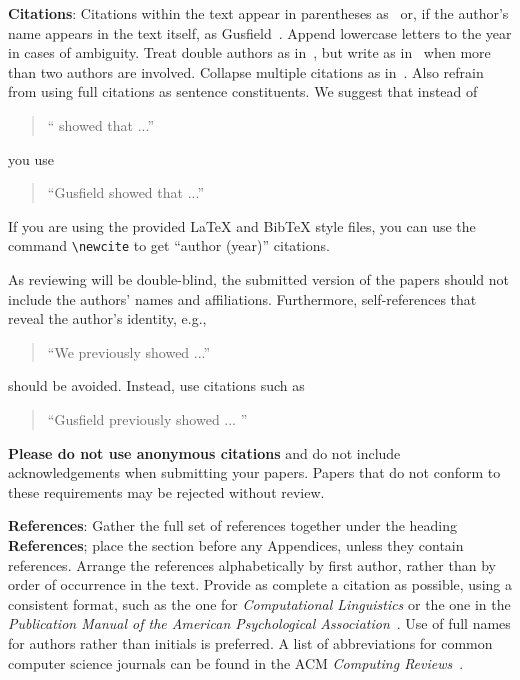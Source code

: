 \documentclass[11pt]{article}
\begin{document}
{\bf Citations}: Citations within the text appear
in parentheses as~\cite{Gusfield:97} or, if the author's name appears in
the text itself, as Gusfield~. 
Append lowercase letters to the year in cases of ambiguity.  
Treat double authors as in~\cite{Aho:72}, but write as in~\cite{Chandra:81} when more than two authors are involved. Collapse multiple citations as in~\cite{Gusfield:97,Aho:72}. Also refrain from using full citations as sentence constituents. We suggest that instead of
\begin{quote}
  ``\cite{Gusfield:97} showed that ...''
\end{quote}
you use
\begin{quote}
``Gusfield    showed that ...''
\end{quote}

If you are using the provided \LaTeX{} and Bib\TeX{} style files, you
can use the command \verb|\newcite| to get ``author (year)'' citations.

As reviewing will be double-blind, the submitted version of the papers should not include the
authors' names and affiliations. Furthermore, self-references that
reveal the author's identity, e.g.,
\begin{quote}
``We previously showed \cite{Gusfield:97} ...''  
\end{quote}
should be avoided. Instead, use citations such as 
\begin{quote}
``Gusfield 
previously showed ... ''
\end{quote}

\textbf{Please do not  use anonymous citations} and  do not include acknowledgements when submitting your papers. Papers that do not conform
to these requirements may be rejected without review. 

\textbf{References}: Gather the full set of references together under
the heading {\bf References}; place the section before any Appendices,
unless they contain references. Arrange the references alphabetically
by first author, rather than by order of occurrence in the text.
Provide as complete a citation as possible, using a consistent format,
such as the one for {\em Computational Linguistics\/} or the one in the 
{\em Publication Manual of the American 
Psychological Association\/}~\cite{APA:83}.  Use of full names for
authors rather than initials is preferred.  A list of abbreviations
for common computer science journals can be found in the ACM 
{\em Computing Reviews\/}~\cite{ACM:83}.
\end{document}
